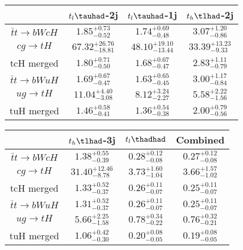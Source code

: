 \centering
\begin{tabular}{|c|c|c|c|} \hline
 & $t_l\tauhad$-2j & $t_l\tauhad$-1j & $t_h\tlhad$-2j\\\hline
$\bar{t}t\to bWcH$ & $1.85^{+0.73}_{-0.52}$ & $1.74^{+0.69}_{-0.48}$ & $3.07^{+1.20}_{-0.86}$\\\hline
$cg\to tH$ & $67.32^{+26.76}_{-18.81}$ & $48.10^{+19.10}_{-13.44}$ & $33.39^{+13.23}_{-9.33}$\\\hline
tcH merged & $1.80^{+0.71}_{-0.50}$ & $1.68^{+0.67}_{-0.47}$ & $2.83^{+1.11}_{-0.79}$\\\hline
$\bar{t}t\to bWuH$ & $1.69^{+0.67}_{-0.47}$ & $1.63^{+0.65}_{-0.45}$ & $3.00^{+1.17}_{-0.84}$\\\hline
$ug\to tH$ & $11.04^{+4.40}_{-3.08}$ & $8.12^{+3.24}_{-2.27}$ & $5.58^{+2.22}_{-1.56}$\\\hline
tuH merged & $1.46^{+0.58}_{-0.41}$ & $1.36^{+0.54}_{-0.38}$ & $2.00^{+0.79}_{-0.56}$\\\hline
\end{tabular}
\begin{tabular}{|c|c|c|c|} \hline
 & $t_h\tlhad$-3j & $t_l\thadhad$ & Combined\\\hline
$\bar{t}t\to bWcH$ & $1.38^{+0.55}_{-0.39}$ & $0.28^{+0.12}_{-0.08}$ & $0.27^{+0.12}_{-0.08}$\\\hline
$cg\to tH$ & $31.40^{+12.46}_{-8.78}$ & $3.73^{+1.60}_{-1.04}$ & $3.66^{+1.57}_{-1.02}$\\\hline
tcH merged & $1.33^{+0.52}_{-0.37}$ & $0.26^{+0.11}_{-0.07}$ & $0.25^{+0.11}_{-0.07}$\\\hline
$\bar{t}t\to bWuH$ & $1.31^{+0.52}_{-0.37}$ & $0.26^{+0.11}_{-0.07}$ & $0.25^{+0.11}_{-0.07}$\\\hline
$ug\to tH$ & $5.66^{+2.25}_{-1.58}$ & $0.78^{+0.34}_{-0.22}$ & $0.76^{+0.32}_{-0.21}$\\\hline
tuH merged & $1.06^{+0.42}_{-0.30}$ & $0.20^{+0.08}_{-0.05}$ & $0.19^{+0.08}_{-0.05}$\\\hline
\end{tabular}
